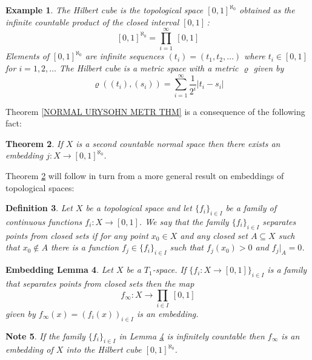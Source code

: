\documentclass[11pt, letterpaper, oneside]{report}
\theoremstyle{pplain}
\newtheorem{theorem}{Theorem}[chapter]
\newtheorem{ITERMVALUE THM}[theorem]{Intermediate Value Theorem}
\newtheorem{HEINEBOREL THM}[theorem]{Heine-Borel Theorem}
\newtheorem{UMETR THM}[theorem]{Urysohn Metrization Theorem}
\newtheorem{UMETR2 THM}[theorem]{Urysohn Metrization Theorem (v.2)}
\newtheorem{EMBEDDINGL}[theorem]{Embedding Lemma}
\theoremstyle{ddefinition}
\newtheorem{definition}[theorem]{Definition}
\newtheorem{example}[theorem]{Example}
\newtheorem{note}[theorem]{Note}
\theoremstyle{nnn}
\newtheorem{TDA NN}[theorem]{Topological Data Analysis. }
\theoremstyle{eexercise}
\begin{document}
\begin{example}
\label{HILBERT CUBE EX}
The \emph{Hilbert cube} is the topological space $[0, 1]^{\aleph_{0}}$  obtained as 
the infinite countable  product of the closed interval $[0, 1]\,$:
$$[0, 1]^{\aleph_{0}} = \prod_{i=1}^{\infty}\ [0, 1]$$
Elements of $[0, 1]^{\aleph_{0}}$ are infinite sequences $(t_{i}) = (t_{1}, t_{2}, \dots)$
where $t_{i}\in [0, 1]$ for $i=1, 2, \dots$ 
The Hilbert cube is a metric space with a metric $\varrho$ given by 
$$\varrho((t_{i}), (s_{i})) = \sum_{i=1}^{\infty} \frac{1}{2^{i}}|t_{i}-s_{i}|$$
\end{example}


Theorem \ref{NORMAL URYSOHN METR THM} is a consequence of  the following fact:

\begin{theorem}
\label{HILBERT CUBE EMBEDDING}
If $X$ is a second countable normal space then there exists an embedding 
$j\colon  X \to [0, 1]^{\aleph_{0}}$. 
\end{theorem}

Theorem \ref{HILBERT CUBE EMBEDDING} will follow in turn from a more general result 
on embeddings of topological spaces: 


\begin{definition}
\label{SEP PTCLO FAMILY DEF}
Let $X$ be a topological space and let $\{f_{i}\}_{i\in I}$ be a family of continuous 
functions $f_{i}\colon X \to [0, 1]$. We say that the family $\{f_{i}\}_{i\in I}$ 
\emph{separates points from closed sets} if for any point $x_{0}\in X$ and any closed set 
$A\subseteq X$ such that $x_{0}\not\in A$ there is a function $f_{j}\in \{f_{i}\}_{i\in I}$
such that $f_{j}(x_{0}) > 0$ and $f_{j}|_{A} = 0$.    
\end{definition}


\begin{EMBEDDINGL}
\label{EMBEDDING LEMMA}
Let $X$ be a $T_{1}$-space. If  $\{f_{i}\colon X \to [0, 1]\}_{i\in I}$ is a family 
that separates points from closed sets then the map 
$$f_{\infty}\colon X \to \prod_{i\in I} \ [0, 1]$$
given by $f_{\infty}(x) = (f_{i}(x))_{i\in I}$ is an embedding. 
\end{EMBEDDINGL}


\begin{note}
If the family $\{f_{i}\}_{i\in I}$ in Lemma \ref{EMBEDDING LEMMA} is infinitely 
countable then $f_{\infty}$ is an embedding of $X$ into the Hilbert cube $[0, 1]^{\aleph_{0}}$.
\end{note}
\end{document}
